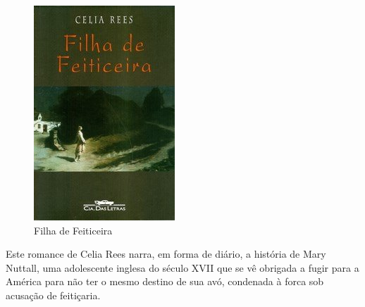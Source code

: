 \begin{figure}[htb]
	\caption{\label{Filha de Feiticeira}Filha de Feiticeira}
	\begin{center}
	    \includegraphics[width=\textwidth/2]{imagens/feiticeira.jpeg}
	\end{center}
\end{figure}

Este romance de Celia Rees narra, em forma de diário, a história de Mary Nuttall, uma adolescente inglesa do século XVII que se vê obrigada a fugir para a América para não ter o mesmo destino de sua avó, condenada à forca sob acusação de feitiçaria.


\clearpage


